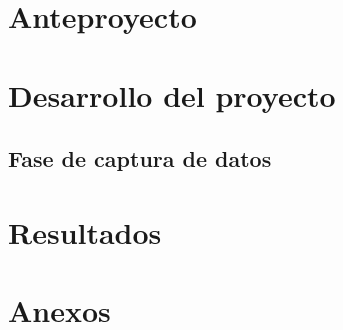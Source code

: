 \documentclass[12pt, twoside]{report}
\begin{document}


%

\newpage
\renewcommand{\contentsname}{\'Indice}
\tableofcontents

\newpage
\chapter{Anteproyecto}



%
\newpage


%
\newpage


%
\newpage


%
\newpage


%
\newpage


%
\newpage


\newpage
\chapter{Desarrollo del proyecto}

\section{Fase de captura de datos}











\newpage
\chapter{Resultados}

\newpage
\renewcommand{\bibname}{Referencias}



\newpage
\chapter{Anexos}\label{cap:anexos}

\end{document}
